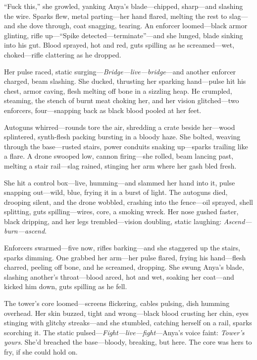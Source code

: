 \documentclass[12pt]{book}
\begin{document}
``Fuck this,'' she growled, yanking Anya’s blade---chipped, sharp---and slashing the wire. Sparks flew, metal parting---her hand flared, melting the rest to slag---and she dove through, coat snagging, tearing. An enforcer loomed---black armor glinting, rifle up---``Spike detected---terminate''---and she lunged, blade sinking into his gut. Blood sprayed, hot and red, guts spilling as he screamed---wet, choked---rifle clattering as he dropped.

Her pulse raced, static surging---\emph{Bridge---live---bridge}---and another enforcer charged, beam slashing. She ducked, thrusting her sparking hand---pulse hit his chest, armor caving, flesh melting off bone in a sizzling heap. He crumpled, steaming, the stench of burnt meat choking her, and her vision glitched---two enforcers, four---snapping back as black blood pooled at her feet.

Autoguns whirred---rounds tore the air, shredding a crate beside her---wood splintered, synth-flesh packing bursting in a bloody haze. She bolted, weaving through the base---rusted stairs, power conduits snaking up---sparks trailing like a flare. A drone swooped low, cannon firing---she rolled, beam lancing past, melting a stair rail---slag rained, stinging her arm where her gash bled fresh.

She hit a control box---live, humming---and slammed her hand into it, pulse snapping out---wild, blue, frying it in a burst of light. The autoguns died, drooping silent, and the drone wobbled, crashing into the fence---oil sprayed, shell splitting, guts spilling---wires, core, a smoking wreck. Her nose gushed faster, black dripping, and her legs trembled---vision doubling, static laughing: \emph{Ascend---burn---ascend}.

Enforcers swarmed---five now, rifles barking---and she staggered up the stairs, sparks dimming. One grabbed her arm---her pulse flared, frying his hand---flesh charred, peeling off bone, and he screamed, dropping. She swung Anya’s blade, slashing another’s throat---blood arced, hot and wet, soaking her coat---and kicked him down, guts spilling as he fell.

The tower’s core loomed---screens flickering, cables pulsing, dish humming overhead. Her skin buzzed, tight and wrong---black blood crusting her chin, eyes stinging with glitchy streaks---and she stumbled, catching herself on a rail, sparks scorching it. The static pulsed---\emph{Fight---live---fight}---Anya’s voice faint: \emph{Tower’s yours}. She’d breached the base---bloody, breaking, but here. The core was hers to fry, if she could hold on.
\end{document}
